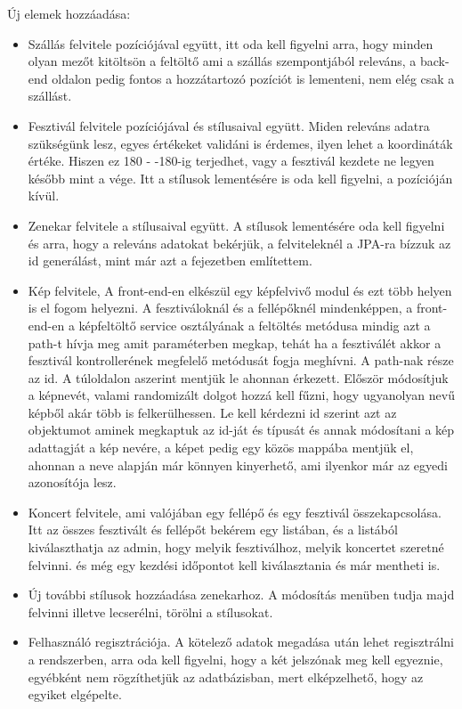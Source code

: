 Új elemek hozzáadása:
\begin{itemize}
\item Szállás felvitele pozíciójával együtt, itt oda kell figyelni arra, hogy minden olyan mezőt kitöltsön a feltöltő ami a szállás szempontjából releváns, a back-end oldalon pedig fontos a hozzátartozó pozíciót is lementeni, nem elég csak a szállást.

\item Fesztivál felvitele pozíciójával és stílusaival együtt. Miden releváns adatra szükségünk lesz, egyes értékeket validáni is érdemes, ilyen lehet a koordináták értéke. Hiszen ez 180 - -180-ig terjedhet, vagy a fesztivál kezdete ne legyen később mint a vége. Itt a stílusok lementésére is oda kell figyelni, a pozícióján kívül.

\item Zenekar felvitele a stílusaival együtt. A stílusok lementésére oda kell figyelni és arra, hogy a releváns adatokat bekérjük, a felviteleknél a JPA-ra bízzuk az id generálást, mint már azt a fejezetben említettem.

\item Kép felvitele, A front-end-en elkészül egy képfelvivő modul és ezt több helyen is el fogom helyezni. A fesztiváloknál és a fellépőknél mindenképpen, a front-end-en a képfeltöltő service osztályának a feltöltés metódusa mindig azt a path-t hívja meg amit paraméterben megkap, tehát ha a fesztiválét akkor a fesztivál kontrollerének megfelelő metódusát fogja meghívni. A path-nak része az id. A túloldalon aszerint mentjük le ahonnan érkezett. Először módosítjuk a képnevét, valami randomizált dolgot hozzá kell fűzni, hogy ugyanolyan nevű képből akár több is felkerülhessen. Le kell kérdezni id szerint azt az objektumot aminek megkaptuk az id-ját és típusát és annak módosítani a kép adattagját a kép nevére, a képet pedig egy közös mappába mentjük el, ahonnan a neve alapján már könnyen kinyerhető, ami ilyenkor már az egyedi azonosítója lesz.

\item Koncert felvitele, ami valójában egy fellépő és egy fesztivál összekapcsolása. Itt az összes fesztivált és fellépőt bekérem egy listában, és a listából kiválaszthatja az admin, hogy melyik fesztiválhoz, melyik koncertet szeretné felvinni. és még egy kezdési időpontot kell kiválasztania és már mentheti is.

\item Új további stílusok hozzáadása zenekarhoz. A módosítás menüben tudja majd felvinni illetve lecserélni, törölni a stílusokat.

\item Felhasználó regisztrációja. A kötelező adatok megadása után lehet regisztrálni a rendszerben, arra oda kell figyelni, hogy a két jelszónak meg kell egyeznie, egyébként nem rögzíthetjük az adatbázisban, mert elképzelhető, hogy az egyiket elgépelte.
\end{itemize}

